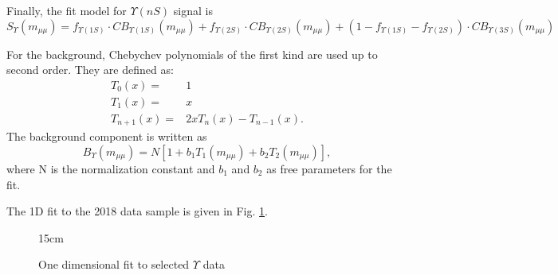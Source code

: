 Finally, the fit model for $\Upsilon(nS)$ signal is
\begin{equation} \label{eq:upsilon_sig}
  S_{\Upsilon}(m_{\mu\mu}) = f_{\Upsilon(1S)}\cdot CB_{\Upsilon(1S)} (m_{\mu\mu}) + f_{\Upsilon(2S)}\cdot CB_{\Upsilon(2S)} (m_{\mu\mu}) + (1-f_{\Upsilon(1S)}-f_{\Upsilon(2S)}) \cdot CB_{\Upsilon(3S)} (m_{\mu\mu})
\end{equation}

For the background, Chebychev polynomials of the first kind are used up to second order. They are defined as:
\begin{equation} \label{eq:upsilon_bkg}
\begin{split}
  T_0(x) = & 1 \\
  T_1(x) = & x \\
  T_{n+1}(x) = & 2xT_n(x) - T_{n-1}(x).
\end{split}
\end{equation}
The background component is written as
\begin{equation}
  B_{\Upsilon}(m_{\mu\mu}) = N[1 + b_1 T_1(m_{\mu\mu}) + b_2 T_2(m_{\mu\mu})],
\end{equation}
where N is the normalization constant and $b_1$ and $b_2$ as free parameters for the fit.

The 1D fit to the 2018 data sample is given in Fig. \ref{fig:fit1D_upsilon}.

\begin{figure}[!htm]{15cm}
  \caption{One dimensional fit to selected $\Upsilon$ data}%
  \label{fig:fit1D_upsilon}
\end{figure}

